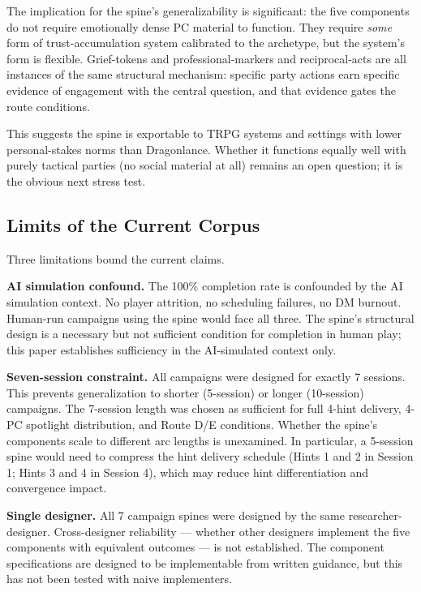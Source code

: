 The implication for the spine's generalizability is significant: the five
components do not require emotionally dense PC material to function. They require
\textit{some} form of trust-accumulation system calibrated to the archetype,
but the system's form is flexible. Grief-tokens and professional-markers and
reciprocal-acts are all instances of the same structural mechanism: specific
party actions earn specific evidence of engagement with the central question,
and that evidence gates the route conditions.

This suggests the spine is exportable to TRPG systems and settings with lower
personal-stakes norms than Dragonlance. Whether it functions equally well with
purely tactical parties (no social material at all) remains an open question;
it is the obvious next stress test.

\subsection{Limits of the Current Corpus}

Three limitations bound the current claims.

\textbf{AI simulation confound.} The 100\% completion rate is confounded by the
AI simulation context. No player attrition, no scheduling failures, no DM burnout.
Human-run campaigns using the spine would face all three. The spine's structural
design is a necessary but not sufficient condition for completion in human play;
this paper establishes sufficiency in the AI-simulated context only.

\textbf{Seven-session constraint.} All campaigns were designed for exactly 7 sessions.
This prevents generalization to shorter (5-session) or longer (10-session) campaigns.
The 7-session length was chosen as sufficient for full 4-hint delivery, 4-PC spotlight
distribution, and Route D/E conditions. Whether the spine's components scale to different
arc lengths is unexamined. In particular, a 5-session spine would need to compress the
hint delivery schedule (Hints 1 and 2 in Session 1; Hints 3 and 4 in Session 4), which
may reduce hint differentiation and convergence impact.

\textbf{Single designer.} All 7 campaign spines were designed by the same
researcher-designer. Cross-designer reliability --- whether other designers
implement the five components with equivalent outcomes --- is not established.
The component specifications are designed to be implementable from written
guidance, but this has not been tested with naive implementers.


